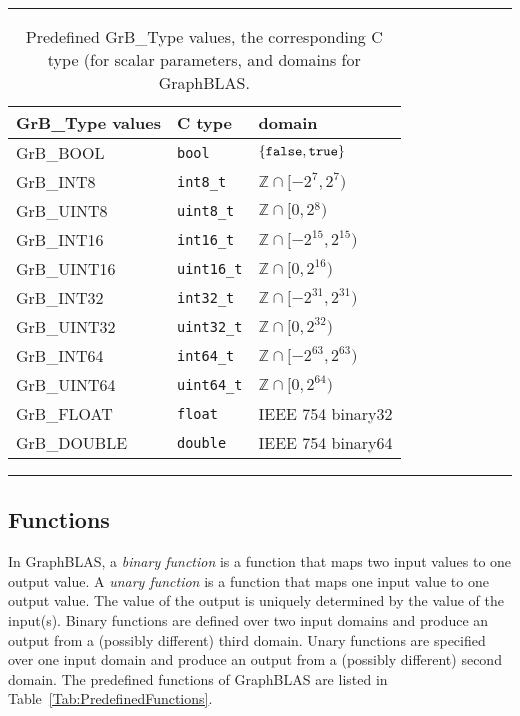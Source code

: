 \begin{table}
\hrule
\begin{center}
\caption{Predefined {\sf GrB\_Type} values, the corresponding C type (for scalar
parameters, and domains for GraphBLAS. 
        }
\label{Tab:PredefinedTypes}
\begin{tabular}{l|l|l}
{\sf GrB\_Type values} & C type            & domain \\
\hline
{\sf GrB\_BOOL}        & {\tt bool}        & $\{ {\tt false}, {\tt true} \}$  \\
{\sf GrB\_INT8}        & {\tt int8\_t}     & $\mathbb{Z} \cap [-2^{7},2^{7})$  \\
{\sf GrB\_UINT8}       & {\tt uint8\_t}    & $\mathbb{Z} \cap [0,2{^8})$  \\
{\sf GrB\_INT16}       & {\tt int16\_t}    & $\mathbb{Z} \cap [-2^{15},2^{15})$ \\
{\sf GrB\_UINT16}      & {\tt uint16\_t}   & $\mathbb{Z} \cap [0,2^{16})$ \\
{\sf GrB\_INT32}       & {\tt int32\_t}    & $\mathbb{Z} \cap [-2^{31},2^{31})$ \\
{\sf GrB\_UINT32}      & {\tt uint32\_t}   & $\mathbb{Z} \cap [0,2^{32})$ \\
{\sf GrB\_INT64}       & {\tt int64\_t}    & $\mathbb{Z} \cap [-2^{63},2^{63})$ \\
{\sf GrB\_UINT64}      & {\tt uint64\_t}   & $\mathbb{Z} \cap [0,2^{64})$ \\
{\sf GrB\_FLOAT}       & {\tt float}       & IEEE 754 {\sf binary32}  \\
{\sf GrB\_DOUBLE}      & {\tt double}      & IEEE 754 {\sf binary64}  \\
\end{tabular}
\end{center}
\hrule
\end{table}

\subsection{Functions}

In GraphBLAS, a \emph{binary function} is a function that maps two input
values to one output value. A \emph{unary function} is a function that 
maps one input value to one output value. The value of the output is uniquely
determined by the value of the input(s).  Binary functions are defined over 
two input domains and produce an output from a (possibly different) third 
domain. Unary functions are specified over one input domain and produce an 
output from a (possibly different) second domain.  The predefined functions 
of GraphBLAS are listed in Table~\ref{Tab:PredefinedFunctions}.

